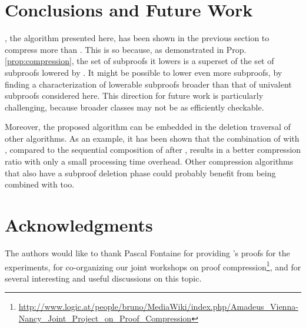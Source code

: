 \documentclass{llncs}
\begin{document}
%

%

\section{Conclusions and Future Work}

{\LowerUnivalents}, the algorithm presented here, has been shown in the previous section to compress
more than {\LowerUnits}. This is so because, as demonstrated in Prop. \ref{prop:compression}, the
set of subproofs it lowers is a superset of the set of subproofs lowered by {\LowerUnits}. It might
be possible to lower even more subproofs, by finding a characterization of lowerable subproofs
broader than that of univalent subproofs considered here. This direction for future work is
particularly challenging, because broader classes may not be as efficiently checkable.

Moreover, the proposed algorithm can be embedded in the deletion traversal of other algorithms.  As
an example, it has been shown that the combination of {\LowerUnivalents} with {\RPI}, compared to
the sequential composition of {\LowerUnits} after {\RPI}, results in a better compression ratio with
only a small processing time overhead. Other compression algorithms that also have a subproof
deletion phase could probably benefit from being combined with {\LowerUnivalents} too.



\section*{Acknowledgments}

The authors would like to thank Pascal Fontaine for providing {\veriT}'s proofs for the experiments,
for co-organizing our joint workshops on proof
compression\footnote{\url{http://www.logic.at/people/bruno/MediaWiki/index.php/Amadeus_Vienna-Nancy_Joint_Project_on_Proof_Compression}},
and for several interesting and useful discussions on this topic.









%
%
%
%
\end{document}
